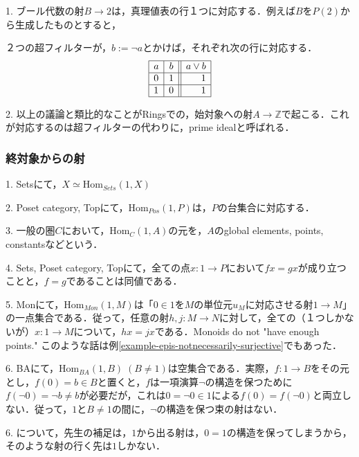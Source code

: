 \documentclass[uplatex, dvipdfmx]{jsarticle}
\begin{document}
\begin{remark*}
    1. ブール代数の射$B\to 2$は，真理値表の行１つに対応する．例えば$B$を$P(2)$から生成したものとすると，
    \begin{center}
    \end{center}
    ２つの超フィルターが，$b:=\lnot a$とかけば，それぞれ次の行に対応する．
    \[\begin{array}{|l|c||r|}\hline
            a & b & a\lor b  \\ \hline
            0 & 1 & 1  \\\hline
            1 & 0 & 1  \\ \hline
    \end{array}\]

    2. 以上の議論と類比的なことがRingsでの，始対象への射$A\to\mathbb{Z}$で起こる．これが対応するのは超フィルターの代わりに，prime idealと呼ばれる．
\end{remark*}

\subsubsection*{終対象からの射}

\begin{example}
    1. Setsにて，$X\simeq\mathrm{Hom}_{Sets}(1,X)$

    2. Poset category, Topにて，$\mathrm{Hom}_{Pos}(1,P)$は，$P$の台集合に対応する．

    3. 一般の圏$C$において，$\mathrm{Hom}_C(1,A)$の元を，$A$のglobal elements, points, constantsなどという．

    4. Sets, Poset category, Topにて，全ての点$x:1\to P$において$fx=gx$が成り立つことと，$f=g$であることは同値である．

    5. Monにて，$\mathrm{Hom}_{Mon}(1,M)$は「$0\in 1$を$M$の単位元$u_M$に対応させる射$1\to M$」の一点集合である．従って，任意の射$h,j:M\to N$に対して，全ての（１つしかないが）$x:1\to M$について，$hx=jx$である．Monoids do not "have enough points."
    このような話は例\ref{example-epis-notnecessarily-surjective}でもあった．

    6. BAにて，$\mathrm{Hom}_{BA}(1,B)\; (B\ne 1)$は空集合である．実際，$f:1\to B$をその元とし，$f(0)=b\in B$と置くと，$f$は一項演算$\lnot$の構造を保つために$f(\lnot 0)=\lnot b\ne b$が必要だが，これは$0=\lnot 0\in 1$による$f(0)=f(\lnot 0)$と両立しない．従って，$1$と$B\ne 1$の間に，$\lnot$の構造を保つ束の射はない．
\end{example}
\begin{remark*}
    6. について，先生の補足は，$1$から出る射は，$0=1$の構造を保ってしまうから，そのような射の行く先は$1$しかない．
\end{remark*}
\end{document}

